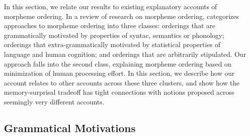 \documentclass[11pt,letterpaper]{article}
\newcommand\mhahn[1]{{\color{red}(#1)}}
\newcommand\becky[1]{{\color{blue}(#1)}}
\begin{document}
In this section, we relate our results to existing explanatory accounts of morpheme ordering.
In a review of research on morpheme ordering, \cite{manova2010modeling} %
categorizes approaches to morpheme ordering into three classes: orderings that are grammatically motivated by properties of syntac, semantics or phonology; orderings that extra-grammatically motivated by statistical properties of language and human cognition; and orderings that are arbitrarily stipulated.
Our approach falls into the second class, explaining morpheme ordering based on minimization of human processing effort.
In this section, we describe how our account relates to other accounts across these three clusters, and show how the memory-surprisal tradeoff has tight connections with notions proposed across seemingly very different accounts.

\subsection{Grammatical Motivations}





\end{document}
